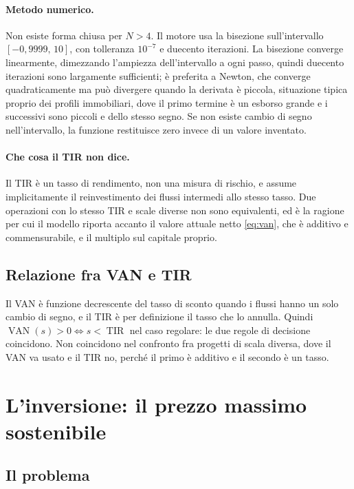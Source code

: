\documentclass[11pt,a4paper]{article}
\theoremstyle{definition}
\theoremstyle{plain}
\DeclareMathOperator{\VAN}{VAN}
\DeclareMathOperator{\TIR}{TIR}
\begin{document}
\paragraph{Metodo numerico.} Non esiste forma chiusa per $N>4$. Il motore usa la bisezione sull'intervallo $[-0{,}9999,\,10]$, con tolleranza $10^{-7}$ e duecento iterazioni. La bisezione converge linearmente, dimezzando l'ampiezza dell'intervallo a ogni passo, quindi duecento iterazioni sono largamente sufficienti; è preferita a Newton, che converge quadraticamente ma può divergere quando la derivata è piccola, situazione tipica proprio dei profili immobiliari, dove il primo termine è un esborso grande e i successivi sono piccoli e dello stesso segno. Se non esiste cambio di segno nell'intervallo, la funzione restituisce zero invece di un valore inventato.

\paragraph{Che cosa il TIR non dice.} Il TIR è un tasso di rendimento, non una misura di rischio, e assume implicitamente il reinvestimento dei flussi intermedi allo stesso tasso. Due operazioni con lo stesso TIR e scale diverse non sono equivalenti, ed è la ragione per cui il modello riporta accanto il valore attuale netto \eqref{eq:van}, che è additivo e commensurabile, e il multiplo sul capitale proprio.

\subsection{Relazione fra VAN e TIR}

Il VAN è funzione decrescente del tasso di sconto quando i flussi hanno un solo cambio di segno, e il TIR è per definizione il tasso che lo annulla. Quindi $\VAN(s)>0 \iff s< \TIR$ nel caso regolare: le due regole di decisione coincidono. Non coincidono nel confronto fra progetti di scala diversa, dove il VAN va usato e il TIR no, perché il primo è additivo e il secondo è un tasso.

\section{L'inversione: il prezzo massimo sostenibile}
\label{sec:inversione}

\subsection{Il problema}
\end{document}
